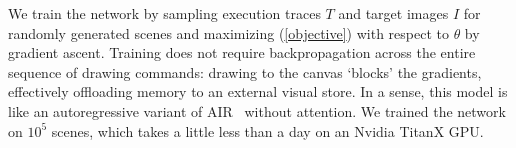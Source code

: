 \documentclass{article}
\newcommand{\remark}[1]{\textcolor{red}{[#1]}}
\begin{document}
We train the network by sampling execution traces $T$ and target
images $I$ for randomly generated scenes
and maximizing
(\ref{objective}) with respect to $\theta$ by gradient ascent.
Training does not require backpropagation across the entire sequence of drawing commands:
drawing to the canvas `blocks' the gradients,
effectively offloading memory to an external visual store.
In a sense, this model is like an autoregressive variant of AIR~\cite{eslami1603attend} without attention.
We trained the network on $10^5$ scenes, which takes a little less than a day on an Nvidia TitanX GPU.

\end{document}
